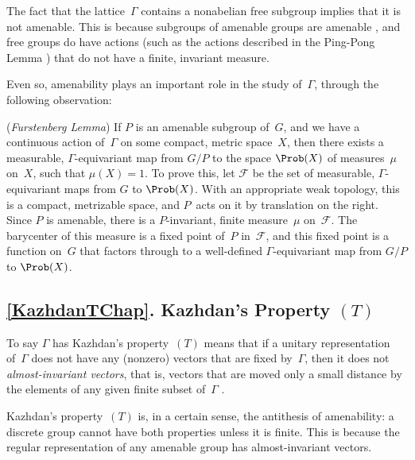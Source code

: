 \smallbreak

 The fact that the lattice~$\Gamma$ contains a nonabelian free subgroup  implies that it is not amenable. This is because subgroups of amenable groups are amenable , and free groups do have actions (such as the actions described in the Ping-Pong Lemma ) that do not have a finite, invariant measure.

\smallbreak

Even so, amenability plays an important role in the study of~$\Gamma$, through the following observation:

\smallskip

 (\emph{Furstenberg Lemma})
If $P$ is an amenable subgroup of~$G$, and we have a continuous action of~$\Gamma$ on some compact, metric space~$X$, then there exists a measurable, $\Gamma$-equivariant map from $G/P$ to the space $\Prob(X)$ of measures~$\mu$ on~$X$, such that $\mu(X) = 1$. To prove this, let $\mathcal{F}$ be the set of measurable, $\Gamma$-equivariant maps from $G$ to $\Prob(X)$. With an appropriate weak topology, this is a compact, metrizable space, and $P$~acts on it by translation on the right. Since $P$ is amenable, there is a $P$-invariant, finite measure~$\mu$ on~$\mathcal{F}$. The barycenter of this measure is a fixed point of~$P$ in~$\mathcal{F}$, and this fixed point is a function on~$G$ that factors through to a well-defined $\Gamma$-equivariant map from $G/P$ to $\Prob(X)$.

\smallbreak



\subsection*{\cref{KazhdanTChap}. Kazhdan's Property $(T)$}
To say $\Gamma$ has Kazhdan's property~$(T)$ means that if a unitary representation of~$\Gamma$ does not have any (nonzero) vectors that are fixed by~$\Gamma$, then it does not \emph{almost-invariant vectors}, that is, vectors that are moved only a small distance by the elements of any given finite subset of~$\Gamma$ .

\smallbreak

 Kazhdan's property~$(T)$ is, in a certain sense, the antithesis of amenability: a discrete group cannot have both properties unless it is finite.
This is because the regular representation of any amenable group has almost-invariant vectors.


